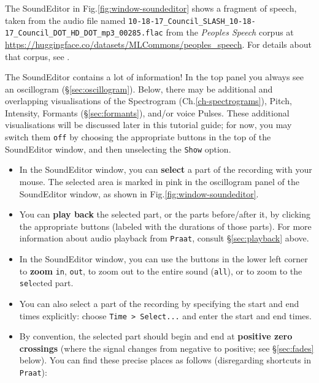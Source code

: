 \documentclass[
]{book}
\begin{document}
\label{box-windowsfile-details}
The SoundEditor in Fig.\ref{fig:window-soundeditor} shows a fragment of speech, taken from the audio file named \texttt{10-18-17\_Council\_SLASH\_10-18-17\_Council\_DOT\_HD\_DOT\_mp3\_00285.flac} from the \emph{Peoples Speech} corpus at \url{https://huggingface.co/datasets/MLCommons/peoples_speech}. For details about that corpus, see \citet{Galvez_Diamos_Ciro_Cerón_Achorn_Gopi_Kanter_Lam_Mazumder_Reddi_2021}.

The SoundEditor contains a lot of information! In the top panel you always see an oscillogram (§\ref{sec:oscillogram}). Below, there may be additional and overlapping visualisations of the Spectrogram (Ch.\ref{ch-spectrograms}), Pitch, Intensity, Formants (§\ref{sec:formants}), and/or voice Pulses. These additional visualisations will be discussed later in this tutorial guide; for now, you may switch them \texttt{off} by choosing the appropriate buttons in the top of the SoundEditor window, and then unselecting the \texttt{Show} option.

\begin{itemize}
\item
  In the SoundEditor window, you can \textbf{select} a part of the recording with your mouse. The selected area is marked in pink in the oscillogram panel of the SoundEditor window, as shown in Fig.\ref{fig:window-soundeditor}.
\item
  You can \textbf{play back} the selected part, or the parts before/after it, by clicking the appropriate buttons (labeled with the durations of those parts). For more information about audio playback from \texttt{Praat}, consult §\ref{sec:playback} above.
\item
  In the SoundEditor window, you can use the buttons in the lower left corner to \textbf{zoom} \texttt{in}, \texttt{out}, to zoom out to the entire sound (\texttt{all}), or to zoom to the \texttt{sel}ected part.
\item
  You can also select a part of the recording by specifying the start and end times explicitly: choose \texttt{Time\ \textgreater{}\ Select...} and enter the start and end times.
\item
  By convention, the selected part should begin and end at \textbf{positive zero crossings} (where the signal changes from negative to positive; see §\ref{sec:fades} below). You can find these precise places as follows (disregarding shortcuts in \texttt{Praat}):
\end{itemize}
\end{document}
